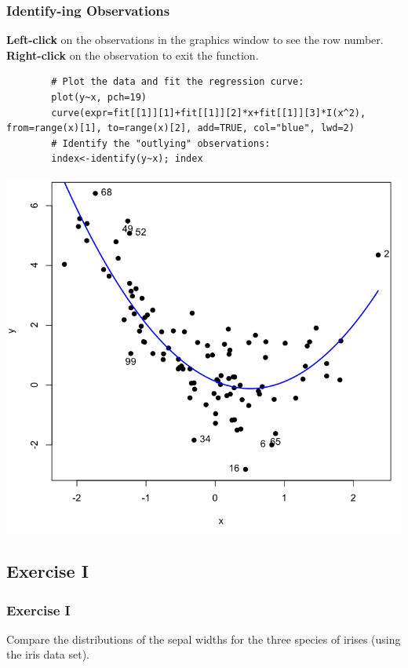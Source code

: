 \begin{frame}
\frametitle{\ttfamily Identify\normalfont-ing Observations}
\textbf{Left-click} \normalfont on the observations in the graphics window to see the row number. \\
\noindent \textbf{Right-click} \normalfont on the observation to exit the function.
	\begin{lstlisting}
		# Plot the data and fit the regression curve:
		plot(y~x, pch=19)
		curve(expr=fit[[1]][1]+fit[[1]][2]*x+fit[[1]][3]*I(x^2), from=range(x)[1], to=range(x)[2], add=TRUE, col="blue", lwd=2)
		# Identify the "outlying" observations:
		index<-identify(y~x); index		
	\end{lstlisting}

\newpage
\begin{center}
\includegraphics[scale=0.27]{images/xyPlotInd.png}
\end{center}

\end{frame}






\subsection{Exercise I}
\begin{frame}
	\frametitle{Exercise I}
	Compare the distributions of the sepal widths for the three species of irises (using the \ttfamily iris \normalfont data set).
\end{frame}